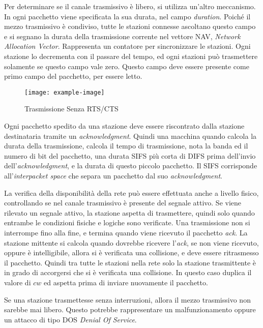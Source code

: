 \documentclass{article}
\numberwithin{equation}{subsection}
\begin{document}
Per determinare se il canale trasmissivo è libero, si utilizza un'altro meccanismo. In ogni pacchetto viene specificata la sua durata, nel campo \textit{duration}. Poiché 
il mezzo trasmissivo è condiviso, tutte le stazioni connesse ascoltano questo campo e si segnano la durata della trasmissione corrente nel vettore NAV, \textit{Network 
Allocation Vector}. Rappresenta un contatore per sincronizzare le stazioni. Ogni stazione lo decrementa con il passare del tempo, ed ogni stazioni può trasmettere 
solamente se questo campo vale zero. Questo campo deve essere presente come primo campo del pacchetto, per essere letto. 

\begin{figure}[H]%
    \centering%
    \texttt{[image: example-image]}%
    \caption{Trasmissione Senza \textcolor{Dandelion}{RTS}/\textcolor{Dandelion}{CTS}}%
\end{figure}

Ogni pacchetto spedito da una stazione deve essere riscontrato dalla stazione destinataria tramite un \textit{acknowledgment}. Quindi una macchina quando calcola la durata 
della trasmissione, calcola il tempo di trasmissione, nota la banda ed il numero di bit del pacchetto, una durata SIFS più corta di DIFS prima dell'invio 
dell'\textit{acknowledgment}, e la durata di questo piccolo pacchetto. Il SIFS corrisponde all'\textit{interpacket space} che separa un pacchetto dal suo \textit{acknowledgment}. 


La verifica della disponibilità della rete può essere effettuata anche a livello fisico, controllando se nel canale trasmissivo è presente del segnale attivo. Se viene rilevato un segnale attivo, la stazione aspetta di trasmettere, quindi solo quando entrambe le condizioni fisiche e logiche sono verificate. 
Una trasmissione non si interrompe fino alla fine, e termina quando viene ricevuto il pacchetto \textit{ack}. La stazione mittente si calcola quando dovrebbe ricevere l'\textit{ack}, se non viene ricevuto, oppure è intelligibile, allora si è verificata 
una collisione, e deve essere ritrasmesso il pacchetto. 
Quindi tra tutte le stazioni nella rete solo la stazione trasmittente è in grado di accorgersi che si è verificata una collisione. In questo caso duplica il valore di $cw$ ed 
aspetta prima di inviare nuovamente il pacchetto.  

Se una stazione trasmettesse senza interruzioni, allora il mezzo trasmissivo non sarebbe mai libero. Questo potrebbe rappresentare un malfunzionamento oppure un attacco di tipo DOS \textit{Denial Of Service}. 
\end{document}
